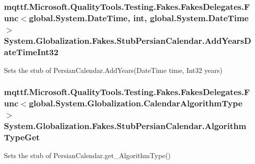 \hypertarget{class_system_1_1_globalization_1_1_fakes_1_1_stub_persian_calendar_aada000274c8a71a8544695969df6aefc}{
\subsubsection[{Add\-Years\-Date\-Time\-Int32}]{\setlength{\rightskip}{0pt plus 5cm}mqttf.\-Microsoft.\-Quality\-Tools.\-Testing.\-Fakes.\-Fakes\-Delegates.\-Func$<$global.\-System.\-Date\-Time, int, global.\-System.\-Date\-Time$>$ System.\-Globalization.\-Fakes.\-Stub\-Persian\-Calendar.\-Add\-Years\-Date\-Time\-Int32}}\label{class_system_1_1_globalization_1_1_fakes_1_1_stub_persian_calendar_aada000274c8a71a8544695969df6aefc}


Sets the stub of Persian\-Calendar.\-Add\-Years(\-Date\-Time time, Int32 years)

\hypertarget{class_system_1_1_globalization_1_1_fakes_1_1_stub_persian_calendar_ad4eb4ae0f6514039c0f8c9ed8f358399}{
\subsubsection[{Algorithm\-Type\-Get}]{\setlength{\rightskip}{0pt plus 5cm}mqttf.\-Microsoft.\-Quality\-Tools.\-Testing.\-Fakes.\-Fakes\-Delegates.\-Func$<$global.\-System.\-Globalization.\-Calendar\-Algorithm\-Type$>$ System.\-Globalization.\-Fakes.\-Stub\-Persian\-Calendar.\-Algorithm\-Type\-Get}}\label{class_system_1_1_globalization_1_1_fakes_1_1_stub_persian_calendar_ad4eb4ae0f6514039c0f8c9ed8f358399}


Sets the stub of Persian\-Calendar.\-get\-\_\-\-Algorithm\-Type()

